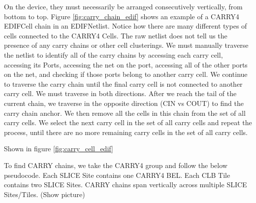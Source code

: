 \documentclass[twocolumn]{article}
\begin{document}
            On the device, they must necessarily be arranged consecutively vertically, from bottom to top. 
            Figure \ref{fig:carry_chain_edif} shows an example of a CARRY4 EDIFCell chain in an EDIFNetlist. 
            Notice how there are many different types of cells connected to the CARRY4 Cells. 
            The raw netlist does not tell us the presence of any carry chains or other cell clusterings. 
            We must manually traverse the netlist to identify all of the carry chains by accessing each carry cell, accessing its Ports, accessing the net on the port, accessing all of the other ports on the net, and checking if those ports belong to another carry cell. 
            We continue to traverse the carry chain until the final carry cell is not connected to another carry cell. 
            We must traverse in both directions. 
            After we reach the tail of the current chain, we traverse in the opposite direction (CIN vs COUT) to find the carry chain anchor. 
            We then remove all the cells in this chain from the set of all carry cells. 
            We select the next carry cell in the set of all carry cells and repeat the process, until there are no more remaining carry cells in the set of all carry cells. 


            Shown in figure \ref{fig:carry_cell_edif} 

            To find CARRY chains, we take the CARRY4 group and follow the below pseudocode. 
            Each SLICE Site contains one CARRY4 BEL. 
            Each CLB Tile contains two SLICE Sites. 
            CARRY chains span vertically across multiple SLICE Sites/Tiles. (Show picture) 
\end{document}
